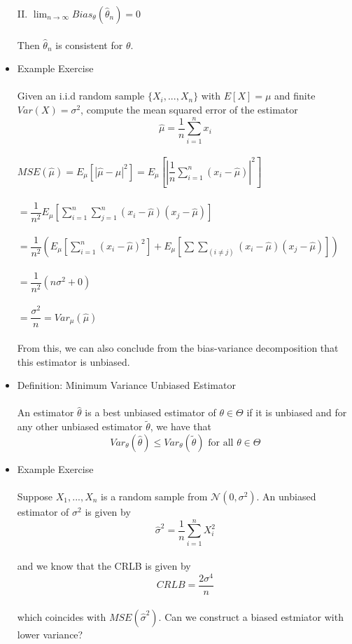 \documentclass{article}
\begin{document}
\begin{itemize}
    II. $\lim_{n\rightarrow\infty}Bias_\theta(\hat{\theta}_n)=0$\\\\
    Then $\hat{\theta}_n$ is consistent for $\theta$.
    \item Example Exercise\\\\
    Given an i.i.d random sample $\{X_i,...,X_n\}$ with $E[X]=\mu$ and finite $Var(X)=\sigma^2$, compute the mean squared error of the estimator\\ $$\hat{\mu}=\dfrac{1}{n}\sum_{i=1}^nx_i$$\\
    $MSE(\hat{\mu})=E_\mu[|\hat{\mu}-\mu|^2]=E_\mu[|\dfrac{1}{n}\sum_{i=1}^n(x_i-\hat{\mu})|^2]$\\\\
    $=\dfrac{1}{n^2}E_\mu[\sum_{i=1}^n\sum_{j=1}^n(x_i-\hat{\mu})(x_j-\hat{\mu})]$\\\\
    $=\dfrac{1}{n^2}(E_\mu[\sum_{i=1}^n(x_i-\hat{\mu})^2]+E_\mu[\sum\sum_{(i\neq j)}(x_i-\hat{\mu})(x_j-\hat{\mu})])$\\\\
    $=\dfrac{1}{n^2}(n\sigma^2+0)$\\\\
    $=\dfrac{\sigma^2}{n}=Var_\mu(\hat{\mu})$\\\\
    From this, we can also conclude from the bias-variance decomposition that this estimator is unbiased.
    \item Definition: Minimum Variance Unbiased Estimator\\\\
    An estimator $\hat{\theta}$ is a best unbiased estimator of $\theta\in\Theta$ if it is unbiased and for any other unbiased estimator $\tilde{\theta}$, we have that\\
    $$Var_\theta(\hat{\theta})\leq Var_\theta(\tilde{\theta})\text{ for all }\theta\in\Theta$$
    \item Example Exercise\\\\
    Suppose $X_1,...,X_n$ is a random sample from $\mathcal{N}(0,\sigma^2)$.  An unbiased estimator of $\sigma^2$ is given by\\
    $$\hat{\sigma}^2=\dfrac{1}{n}\sum_{i=1}^nX_i^2$$\\
    and we know that the CRLB is given by\\
    $$CRLB=\dfrac{2\sigma^4}{n}$$\\
    which coincides with $MSE(\hat{\sigma}^2)$.  Can we construct a biased estmiator with lower variance?\\\\

\end{itemize}
\end{document}
